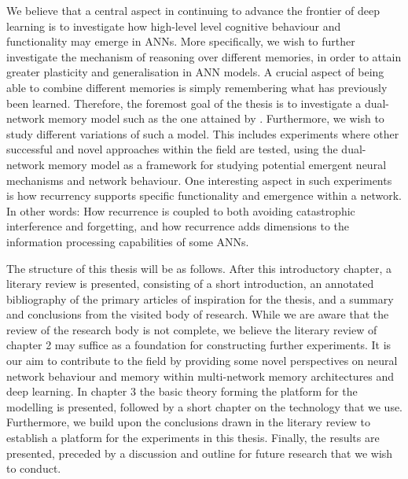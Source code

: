 We believe that a central aspect in continuing to advance the frontier of deep learning is to investigate how high-level level cognitive behaviour and functionality may emerge in ANNs. More specifically, we wish to further investigate the mechanism of reasoning over different memories, in order to attain greater plasticity and generalisation in ANN models. A crucial aspect of being able to combine different memories is simply remembering what has previously been learned. Therefore, the foremost goal of the thesis is to investigate a dual-network memory model such as the one attained by \cite{Hattori2014}. Furthermore, we wish to study different variations of such a model. This includes experiments where other successful and novel approaches within the field are tested, using the dual-network memory model as a framework for studying potential emergent neural mechanisms and network behaviour.
One interesting aspect in such experiments is how recurrency supports specific functionality and emergence within a network. In other words: How recurrence is coupled to both avoiding catastrophic interference and forgetting, and how recurrence adds dimensions to the information processing capabilities of some ANNs.

The structure of this thesis will be as follows. After this introductory chapter, a literary review is presented, consisting of a short introduction, an annotated bibliography of the primary articles of inspiration for the thesis, and a summary and conclusions from the visited body of research. While we are aware that the review of the research body is not complete, we believe the literary review of chapter 2 may suffice as a foundation for constructing further experiments. It is our aim to contribute to the field by providing some novel perspectives on neural network behaviour and memory within multi-network memory architectures and deep learning. In chapter 3 the basic theory forming the platform for the modelling is presented, followed by a short chapter on the technology that we use. Furthermore, we build upon the conclusions drawn in the literary review to establish a platform for the experiments in this thesis. Finally, the results are presented, preceded by a discussion and outline for future research that we wish to conduct.


\cleardoublepage